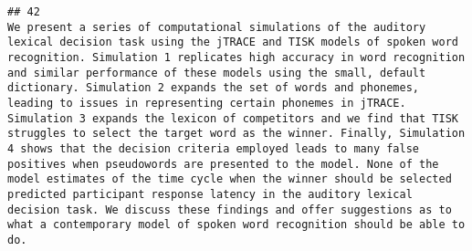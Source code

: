 \documentclass[
  english,
  man]{apa6}
\begin{document}
\begin{verbatim}
## 42                                                                                                                                                                                                                                                                                                                                                                                                                                                                                                                                                                                                                                                                                                                                                                                                                                                                                                                                                                                                                                                                                                                                                                                                                                                                                                                                                                                                                                                                                                                                                                                                                                                                                          We present a series of computational simulations of the auditory lexical decision task using the jTRACE and TISK models of spoken word recognition. Simulation 1 replicates high accuracy in word recognition and similar performance of these models using the small, default dictionary. Simulation 2 expands the set of words and phonemes, leading to issues in representing certain phonemes in jTRACE. Simulation 3 expands the lexicon of competitors and we find that TISK struggles to select the target word as the winner. Finally, Simulation 4 shows that the decision criteria employed leads to many false positives when pseudowords are presented to the model. None of the model estimates of the time cycle when the winner should be selected predicted participant response latency in the auditory lexical decision task. We discuss these findings and offer suggestions as to what a contemporary model of spoken word recognition should be able to do.

\end{verbatim}
\end{document}
